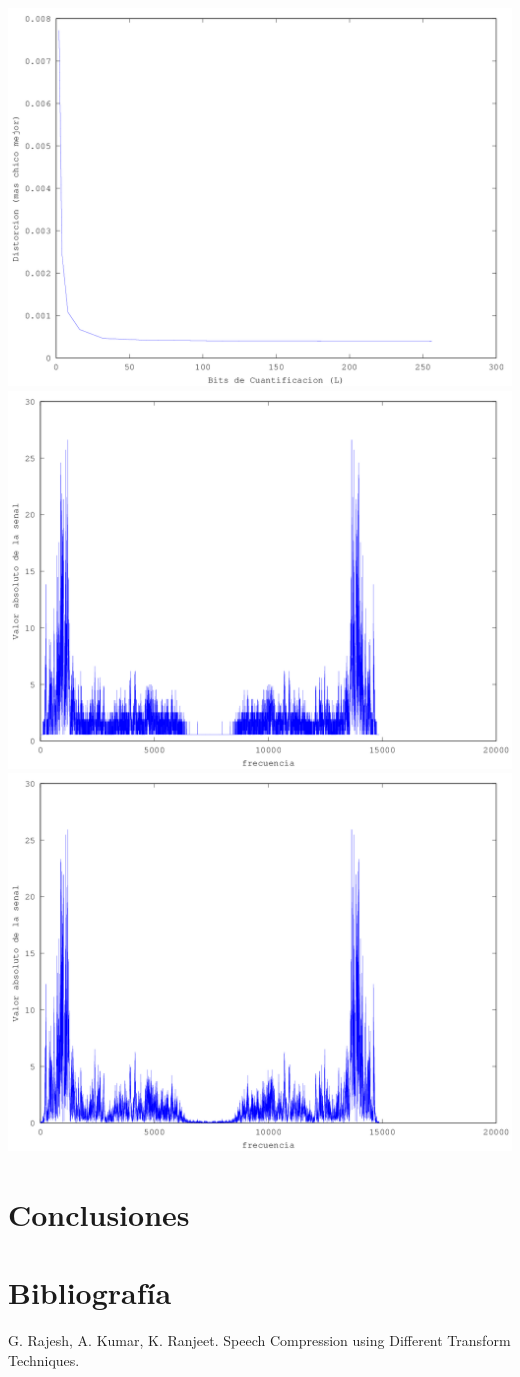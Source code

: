 \documentclass[a4paper,11pt]{article}
\begin{document}
\includegraphics[scale=0.8]{distorcion_media_fixed_epsilon.png}
\includegraphics[scale=0.8]{signal_with_compression.png}
\includegraphics[scale=0.8]{signal_without_compression.png}
\section{Conclusiones}
\newpage
\section{Bibliograf\'ia}
G. Rajesh, A. Kumar, K. Ranjeet. Speech Compression using Different Transform Techniques.
\end{document}
